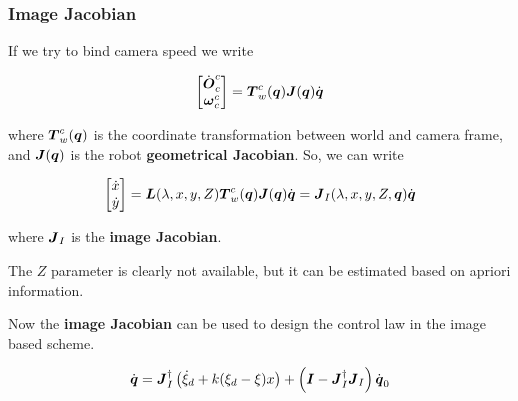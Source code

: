 \subsubsection{Image Jacobian}

If we try to bind camera speed we write

\[ \begin{bmatrix} \dot{\boldsymbol{O}}_c^c \\ \boldsymbol{\omega}_c^c \end{bmatrix} = \boldsymbol{T}_w^c(\boldsymbol{q}) \boldsymbol{J}(\boldsymbol{q})\dot{\boldsymbol{q}} \]

where $ \boldsymbol{T}_w^c(\boldsymbol{q})$ is the coordinate transformation between world and camera frame, and $\boldsymbol{J}(\boldsymbol{q})$ is the robot \textbf{geometrical Jacobian}.
So, we can write

\[
	\begin{bmatrix} \dot{x} \\ \dot{y} \end{bmatrix} =
	\boldsymbol{L}(\lambda, x, y, Z) \boldsymbol{T}_w^c(\boldsymbol{q}) \boldsymbol{J}(\boldsymbol{q})\dot{\boldsymbol{q}} = \boldsymbol{J}_I(\lambda, x, y, Z, \boldsymbol{q}) \dot{\boldsymbol{q}}
\]

where $\boldsymbol{J}_I$ is the \textbf{image Jacobian}.

The $Z$ parameter is clearly not available, but it can be estimated based on apriori information.

Now the \textbf{image Jacobian} can be used to design the control law in the image based scheme.

\[ \dot{\boldsymbol{q}} = \boldsymbol{J}_I^\dag \left(\dot{\xi}_d + k (\xi_d - \xi)x\right) + \left(\boldsymbol{I} - \boldsymbol{J}_I^\dag\boldsymbol{J}_I \right)\dot{\boldsymbol{q}}_0 \]